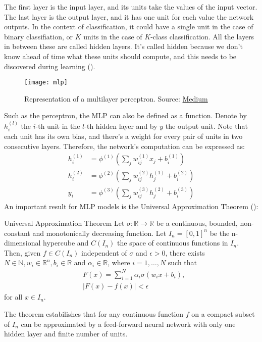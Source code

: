The first layer is the input layer, and its units take the values of the input vector. The last layer is the output layer, and it has one unit for each value the network outputs. In the context of classification, it could have a single unit in the case of binary classifiation, or $K$ units in the case of $K$-class classification. All the layers in between these are called hidden layers. It's called hidden because we don't know ahead of time what these units should compute, and this needs to be discovered during learning (\cite{grosse2021}).
\begin{figure}[H]
    \texttt{[image: mlp]}
    \caption{Representation of a multilayer perceptron. Source: \href{https://kinder-chen.medium.com/multilayer-perceptron-55bb39a08133}{Medium}}
\end{figure}
Such as the perceptron, the MLP can also be defined as a function. Denote by $h_i^{(l)}$ the $i$-th unit in the $l$-th hidden layer and by $y$ the output unit. Note that each unit has its own bias, and there's a weight for every pair of units in two consecutive layers. Therefore, the network's computation can be expressed as:
\begin{align}
    h_i^{(1)} &= \phi^{(1)} \left(\sum_j w_{ij}^{(1)}x_j + b_i^{(1)}\right) \nonumber \\
    h_i^{(2)} &= \phi^{(2)} \left(\sum_j w_{ij}^{(2)}h_j^{(1)} + b_i^{(2)}\right) \\
    y_i &= \phi^{(3)} \left(\sum_j w_{ij}^{(3)}h_j^{(2)} + b_i^{(3)}\right) \nonumber
\end{align}
An important result for MLP models is the Universal Approximation Theorem (\cite{journals/mcss/Cybenko89}):
\begin{theorem}{Universal Approximation Theorem}
    Let $\sigma: \mathbb{R} \rightarrow \mathbb{R}$ be a continuous, bounded, non-constant and monotonically decreasing function. Let $I_{n}=[0,1]^{n}$ be the n-dimensional hypercube and $C\left(I_{n}\right)$ the space of continuous functions in $I_{n}$. Then, given $f \in C\left(I_{n}\right)$ independent of $\sigma$ and $\epsilon>0$, there exists $N \in \mathbb{N}, w_{i} \in \mathbb{R}^{n}, b_{i} \in \mathbb{R}$ and $\alpha_{i} \in \mathbb{R}$, where $i=1, \ldots, N$ such that 
    \[
    \begin{aligned}
    &F(x)=\sum_{i=1}^{N} \alpha_{i} \sigma(w_ix+b_i), \\
    &|F(x) - f(x)| < \epsilon
    \end{aligned}
    \]
    for all $x \in I_{n}$.
\end{theorem}
The theorem estabilishes that for any continuous function $f$ on a compact subset of $I_n$ can be approximated by a feed-forward neural network with only one hidden layer and finite number of units.

